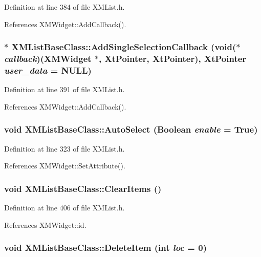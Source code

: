 Definition at line 384 of file XMList.h.

References XMWidget::Add\-Callback().
\subsubsection{$\ast$ XMList\-Base\-Class::Add\-Single\-Selection\-Callback (void($\ast$ {\em callback})({\bf XMWidget} $\ast$, Xt\-Pointer, Xt\-Pointer), Xt\-Pointer {\em user\_\-data} = NULL)\hspace{0.3cm}{\tt  [inline]}}\label{classXMListBaseClass_a17}




Definition at line 391 of file XMList.h.

References XMWidget::Add\-Callback().
\subsubsection{\setlength{\rightskip}{0pt plus 5cm}void XMList\-Base\-Class::Auto\-Select (Boolean {\em enable} = True)\hspace{0.3cm}{\tt  [inline]}}\label{classXMListBaseClass_a4}




Definition at line 323 of file XMList.h.

References XMWidget::Set\-Attribute().
\subsubsection{\setlength{\rightskip}{0pt plus 5cm}void XMList\-Base\-Class::Clear\-Items ()\hspace{0.3cm}{\tt  [inline]}}\label{classXMListBaseClass_a19}




Definition at line 406 of file XMList.h.

References XMWidget::id.
\subsubsection{\setlength{\rightskip}{0pt plus 5cm}void XMList\-Base\-Class::Delete\-Item (int {\em loc} = 0)\hspace{0.3cm}{\tt  [inline]}}\label{classXMListBaseClass_a21}




